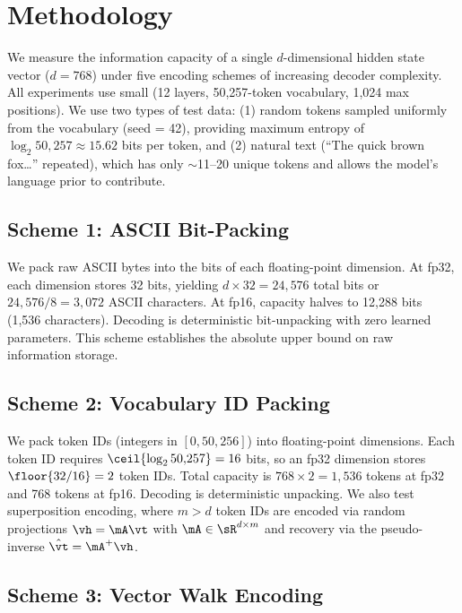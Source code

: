 \section{Methodology}
\label{sec:method}

We measure the information capacity of a single $d$-dimensional hidden state vector ($d = 768$) under five encoding schemes of increasing decoder complexity. All experiments use \gptwo small (12 layers, 50,257-token vocabulary, 1,024 max positions). We use two types of test data: (1) random tokens sampled uniformly from the vocabulary (seed = 42), providing maximum entropy of $\log_2 50{,}257 \approx 15.62$ bits per token, and (2) natural text (``The quick brown fox\ldots'' repeated), which has only $\sim$11--20 unique tokens and allows the model's language prior to contribute.

\subsection{Scheme 1: ASCII Bit-Packing}
\label{sec:method_ascii}

We pack raw ASCII bytes into the bits of each floating-point dimension. At fp32, each dimension stores 32 bits, yielding $d \times 32 = 24{,}576$ total bits or $24{,}576 / 8 = 3{,}072$ ASCII characters. At fp16, capacity halves to 12,288 bits (1,536 characters). Decoding is deterministic bit-unpacking with zero learned parameters. This scheme establishes the absolute upper bound on raw information storage.

\subsection{Scheme 2: Vocabulary ID Packing}
\label{sec:method_vocab}

We pack token IDs (integers in $[0, 50{,}256]$) into floating-point dimensions. Each token ID requires $\ceil{\log_2 50{,}257} = 16$ bits, so an fp32 dimension stores $\floor{32/16} = 2$ token IDs. Total capacity is $768 \times 2 = 1{,}536$ tokens at fp32 and 768 tokens at fp16. Decoding is deterministic unpacking. We also test superposition encoding, where $m > d$ token IDs are encoded via random projections $\vh = \mA \vt$ with $\mA \in \sR^{d \times m}$ and recovery via the pseudo-inverse $\hat{\vt} = \mA^+ \vh$.

\subsection{Scheme 3: Vector Walk Encoding}
\label{sec:method_vecwalk}

